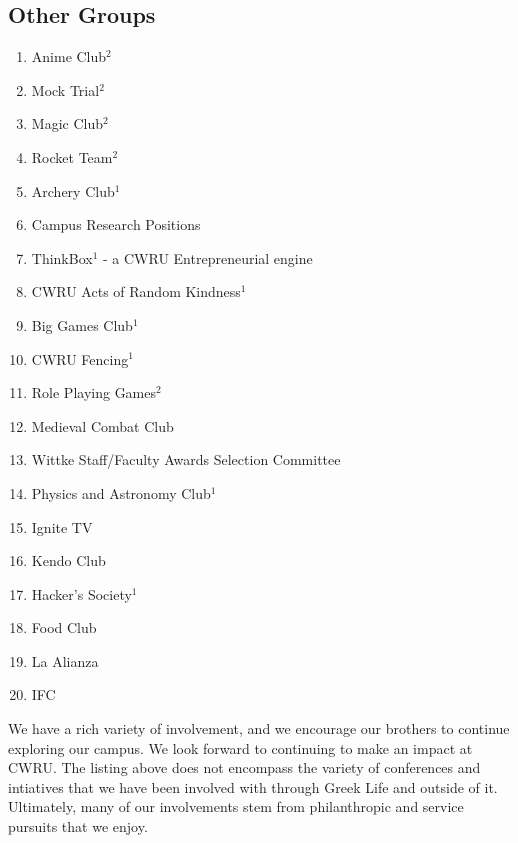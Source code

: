     \subsection*{Other Groups}
      \begin{enumerate}
      	\item Anime Club$^2$
      	
      	\item Mock Trial$^2$
      	
      	\item Magic Club$^2$
      	
      	\item Rocket Team$^2$
      	
	\item Archery Club$^1$
	
	\item Campus Research Positions
	
	\item ThinkBox$^1$ - a CWRU Entrepreneurial engine
	
	\item CWRU Acts of Random Kindness$^1$
	
	\item Big Games Club$^1$
	
	\item CWRU Fencing$^1$
	
	\item Role Playing Games$^2$
	
	\item Medieval Combat Club
	
	\item Wittke Staff/Faculty Awards Selection Committee
	
	\item Physics and Astronomy Club$^1$
	
	\item Ignite TV
	
	\item Kendo Club
	
	\item Hacker's Society$^1$
	
	\item Food Club
	
	\item La Alianza
	
	\item IFC
	
      \end{enumerate}

  We have a rich variety of involvement, and we encourage our brothers to continue exploring our campus. We look forward to continuing to make an impact at CWRU. The listing above does not encompass the variety of conferences and intiatives that we have been involved with through Greek Life and outside of it. Ultimately, many of our involvements stem from philanthropic and service pursuits that we enjoy.
